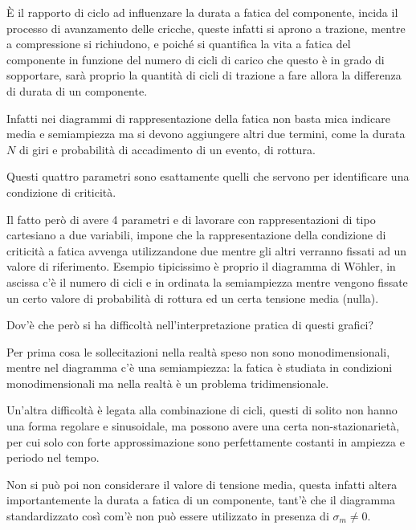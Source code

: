 \documentclass{article}
\begin{document}
\begin{adjustwidth}{2in}{}
		È il rapporto di ciclo ad influenzare la durata a fatica del componente, incida il processo di avanzamento delle cricche, queste infatti si aprono a trazione, mentre a compressione si richiudono, e poiché si quantifica la vita a fatica del componente in funzione del numero di cicli di carico che questo è in grado di sopportare, sarà proprio la quantità di cicli di trazione a fare allora la differenza di durata di un componente. \newline
		 
		Infatti nei diagrammi di rappresentazione della fatica non basta mica indicare media e semiampiezza ma si devono aggiungere altri due termini, come la durata $ N $ di giri e probabilità di accadimento di un evento, di rottura.
		 
		Questi quattro parametri sono esattamente quelli che servono per identificare una condizione di criticità.
		
		Il fatto però di avere 4 parametri e di lavorare con rappresentazioni di tipo cartesiano a due variabili, impone che la rappresentazione della condizione di criticità a fatica avvenga utilizzandone due mentre gli altri verranno fissati ad un valore di riferimento. Esempio tipicissimo è proprio il diagramma di Wöhler, in ascissa c'è il numero di cicli e in ordinata la semiampiezza mentre vengono fissate un certo valore di probabilità di rottura ed un certa tensione media (nulla). \newline
		 
		Dov'è che però si ha difficoltà nell'interpretazione pratica di questi grafici? 
		
		Per prima cosa le sollecitazioni nella realtà speso non sono monodimensionali, mentre nel diagramma c'è una semiampiezza: la fatica è studiata in condizioni monodimensionali ma nella realtà è un problema tridimensionale.
		
		Un'altra difficoltà è legata alla combinazione di cicli, questi di solito non hanno una forma regolare e sinusoidale, ma possono avere una certa non-stazionarietà, per cui solo con forte approssimazione sono perfettamente costanti in ampiezza e periodo nel tempo. 
		
		Non si può poi non considerare il valore di tensione media, questa infatti altera importantemente la durata a fatica di un componente, tant'è che il diagramma standardizzato così com'è non può essere utilizzato in presenza di $\sigma_m\ne0$.
		

\end{adjustwidth}
\end{document}
